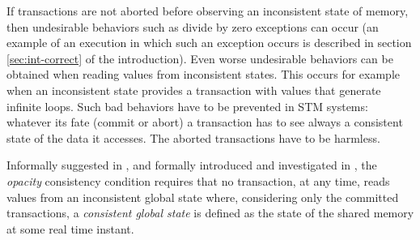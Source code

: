 If transactions are not aborted before observing an inconsistent state of memory, then undesirable
behaviors such as divide by zero exceptions can occur
(an example of an execution in which such an exception occurs
is described in section \ref{sec:int-correct} of the introduction).
Even worse undesirable  behaviors can  be
obtained when  reading values from inconsistent  states. 
This occurs for example when an inconsistent state provides a transaction 
with values that generate infinite loops.
Such  bad  behaviors have  to  be prevented in  STM systems: 
whatever its fate (commit or abort) a transaction has to see always  
a consistent  state of  the data it  accesses. The aborted transactions
have to be harmless.  



Informally suggested  in   \cite{DSS06},  and  formally introduced  
and investigated in \cite{GK08}, the  {\it   opacity} consistency condition
requires  that  no transaction, at any time, reads  values from an inconsistent global 
state  where, considering only the committed transactions,  
a  {\it consistent  global  state} is defined as the  
state of the shared memory at some real time instant. 
%

